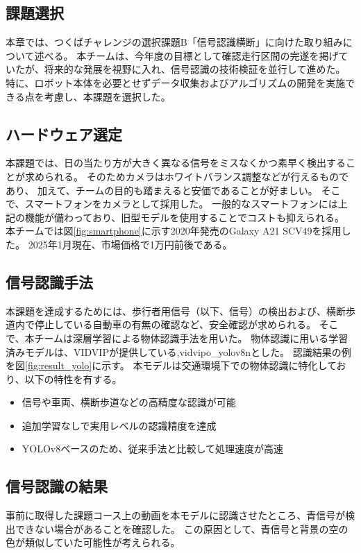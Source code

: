 \documentclass[twocolumn,9pt]{jsproceedings}
\begin{document}
\subsection{課題選択}
本章では、つくばチャレンジの選択課題B「信号認識横断」に向けた取り組みについて述べる。
本チームは、今年度の目標として確認走行区間の完遂を掲げていたが、将来的な発展を視野に入れ、信号認識の技術検証を並行して進めた。
特に、ロボット本体を必要とせずデータ収集およびアルゴリズムの開発を実施できる点を考慮し、本課題を選択した。

\subsection{ハードウェア選定}
本課題では、日の当たり方が大きく異なる信号をミスなくかつ素早く検出することが求められる。
そのためカメラはホワイトバランス調整などが行えるものであり、
加えて、チームの目的も踏まえると安価であることが好ましい。
そこで、スマートフォンをカメラとして採用した。
一般的なスマートフォンには上記の機能が備わっており、旧型モデルを使用することでコストも抑えられる。
本チームでは図\ref{fig:smartphone}に示す2020年発売のGalaxy A21 SCV49を採用した。
2025年1月現在、市場価格で1万円前後である。

\subsection{信号認識手法}
本課題を達成するためには、歩行者用信号（以下、信号）の検出および、横断歩道内で停止している自動車の有無の確認など、安全確認が求められる。
そこで、本チームは深層学習による物体認識手法を用いた。
物体認識に用いる学習済みモデルは、VIDVIP\cite{BabaVIDVIP}が提供している,vidvipo\_yolov8nとした。
認識結果の例を図\ref{fig:result_yolo}に示す。
本モデルは交通環境下での物体認識に特化しており、以下の特性を有する。

\begin{itemize}
    \item 信号や車両、横断歩道などの高精度な認識が可能
    \item 追加学習なしで実用レベルの認識精度を達成
    \item YOLOv8ベースのため、従来手法と比較して処理速度が高速
\end{itemize}

\subsection{信号認識の結果}
事前に取得した課題コース上の動画を本モデルに認識させたところ、青信号が検出できない場合があることを確認した。
この原因として、青信号と背景の空の色が類似していた可能性が考えられる。
\end{document}
